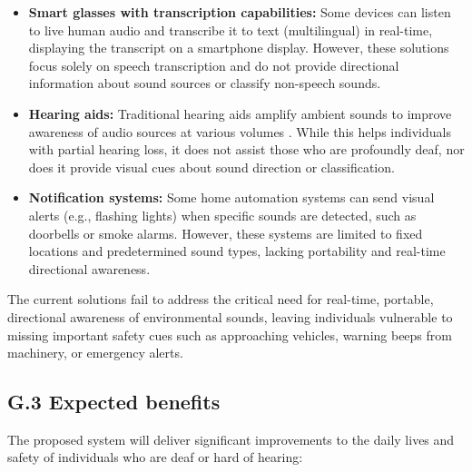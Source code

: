 \documentclass[12pt]{article}
\theoremstyle{definition}
\begin{document}
\begin{itemize}
\item \textbf{Smart glasses with transcription capabilities:} Some devices
can listen to live human audio and transcribe it to text (multilingual) in
real-time, displaying the transcript on a smartphone display.
However, these solutions focus solely on speech transcription and do not
provide directional information about sound sources or classify non-speech
sounds.

\item \textbf{Hearing aids:} Traditional hearing aids amplify ambient sounds
to improve awareness of audio sources at various volumes \cite{NIDCD2022}. 
While this helps individuals with partial hearing loss, it does not assist 
those who are profoundly deaf, nor does it provide visual cues about sound 
direction or classification.

\item \textbf{Notification systems:} Some home automation systems can send
visual alerts (e.g., flashing lights) when specific sounds are detected,
such as doorbells or smoke alarms. However, these systems are limited to
fixed locations and predetermined sound types, lacking portability and
real-time directional awareness.
\end{itemize}

The current solutions fail to address the critical need for real-time,
portable, directional awareness of environmental sounds, leaving individuals
vulnerable to missing important safety cues such as approaching vehicles,
warning beeps from machinery, or emergency alerts.

\subsection{G.3 Expected benefits}

The proposed system will deliver significant improvements to the daily lives
and safety of individuals who are deaf or hard of hearing:
\end{document}
